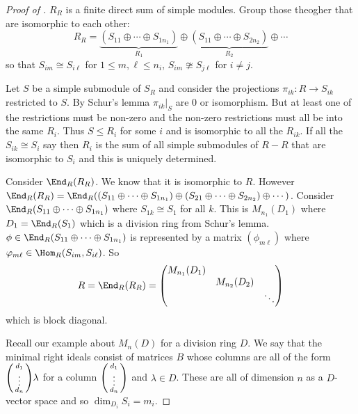 \documentclass[a4paper]{article}
\begin{document}
\begin{proof}[Proof of ]
  \(R_R\) is a finite direct sum of simple modules. Group those theogher that are isomorphic to each other:
  \[
    R_R = \underbrace{(S_{11} \oplus \cdots \oplus S_{1 n_1})}_{R_1} \oplus \underbrace{(S_{11} \oplus \cdots \oplus S_{2 n_2})}_{R_2} \oplus \cdots
  \]
  so that \(S_{im} \cong S_{i\ell}\) for \(1 \leq m, \ell \leq n_i\), \(S_{im} \ncong S_{j\ell}\) for \(i \neq j\).

  Let \(S\) be a simple submodule of \(S_R\) and consider the projections \(\pi_{ik}: R \to S_{ik}\) restricted to \(S\). By Schur's lemma \(\pi_{ik}|_S\) are \(0\) or isomorphism. But at least one of the restrictions must be non-zero and the non-zero restrictions must all be into the same \(R_i\). Thus \(S \leq R_i\) for some \(i\) and is isomorphic to all the \(R_{ik}\). If all the \(S_{ik} \cong S_i\) say then \(R_i\) is the sum of all simple submodules of \(R-R\) that are isomorphic to \(S_i\) and this is uniquely determined.

  Consider \(\End_R(R_R)\). We know that it is isomorphic to \(R\). However \(\End_R(R_R) = \End_R((S_{11} \oplus \cdots \oplus S_{1n_1}) \oplus (S_{21} \oplus \cdots \oplus S_{2 n_2}) \oplus \cdots)\). Consider \(\End_R(S_{11} \oplus \cdots \oplus S_{1 n_1})\) where \(S_{1k} \cong S_1\) for all \(k\). This is \(M_{n_1}(D_1)\) where \(D_1 = \End_R(S_1)\) which is a division ring from Schur's lemma. \(\phi \in \End_R(S_{11} \oplus \cdots \oplus S_{1n_1})\) is represented by a matrix \((\phi_{m\ell})\) where \(\varphi_{m\ell} \in \Hom_R(S_{im}, S_{i\ell})\). So
  \[
    R = \End_R(R_R) =
    \begin{pmatrix}
      M_{n_1}(D_1) \\
      & M_{n_2}(D_2) \\
      & & \ddots
    \end{pmatrix}
  \]
  which is block diagonal.

  Recall our example about \(M_n(D)\) for a division ring \(D\). We say that the minimal right ideals consist of matrices \(B\) whose columns are all of the form \(
  \begin{psmallmatrix}
    d_1 \\
    \vdots \\
    d_n
  \end{psmallmatrix}
  \lambda\) for a column \(
  \begin{psmallmatrix}
    d_1 \\
    \vdots \\
    d_n
  \end{psmallmatrix}
  \) and \(\lambda \in D\). These are all of dimension \(n\) as a \(D\)-vector space and so \(\dim_{D_i} S_i = m_i\).
\end{proof}
\end{document}
